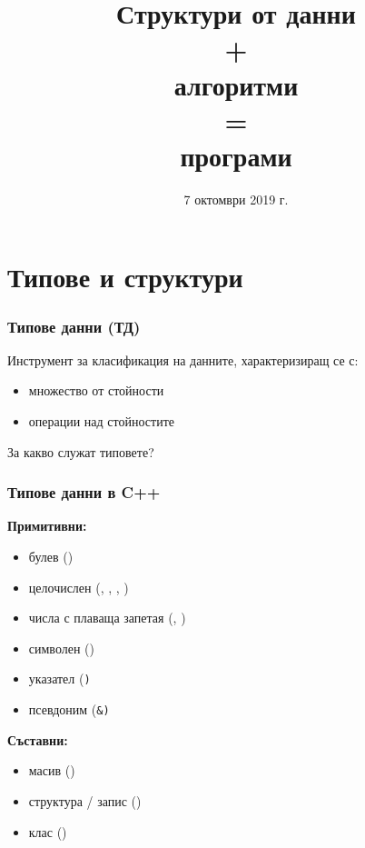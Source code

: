 \documentclass[alsotrans]{beamerswitch}
\title[СД+А=П]{Структури от данни\\+\\алгоритми\\=\\програми}
\date{7 октомври 2019 г.}
\begin{document}
\begin{frame}
  \titlepage
\end{frame}

\begin{frame}
  \nocite{*}
  
  
\end{frame}

\section{Типове и структури}

\begin{frame}
  \frametitle{Типове данни (ТД)}

  Инструмент за класификация на данните, характеризиращ се с:
  \begin{itemize}
  \item множество от стойности
  \item операции над стойностите
  \end{itemize}
  \vspace{2ex}
  \pause
  \alert{За какво служат типовете?}
\end{frame}

\begin{frame}
  \frametitle{Типове данни в C++}

  \textbf{Примитивни:}
  \begin{itemize}
  \item булев ()
  \item целочислен (, , , )
  \item числа с плаваща запетая (, )
  \item символен ()
  \item указател (\tt*)
  \item псевдоним (\tt\&)
  \end{itemize}

  \textbf{Съставни:}
  \begin{itemize}
  \item масив (\lst{[]})
  \item структура / запис ()
  \item клас ()
  \end{itemize}
\end{frame}
\end{document}
